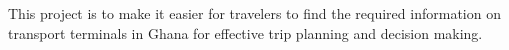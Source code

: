 

\begin{abstracts}        %
This project is to make it easier for travelers to find the required information on transport terminals in Ghana for effective trip planning and decision making. 
\end{abstracts}


